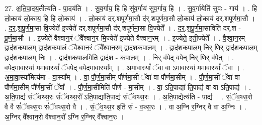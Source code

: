 \documentclass[17pt]{extarticle}
\begin{document}
27. अ॒ति॒पा॒दय॒तीत्य॑ति - पा॒दय॑ति । . सु॒व॒र्गाय॒ हि हि सु॑व॒र्गाय॑ सुव॒र्गाय॒ हि । . सु॒व॒र्गायेति॑ सुवः - गाय॑ । . हि लो॒काय॑ लो॒काय॒ हि हि लो॒काय॑ । . लो॒काय॑ दर्.शपूर्णमा॒सौ द॑र्.शपूर्णमा॒सौ लो॒काय॑ लो॒काय॑ दर्.शपूर्णमा॒सौ । . द॒र्॒.श॒पू॒र्ण॒मा॒सा वि॒ज्येते॑ इ॒ज्येते॑ दर्.शपूर्णमा॒सौ द॑र्.शपूर्णमा॒सा वि॒ज्येते᳚ । . द॒र्॒.श॒पू॒र्ण॒मा॒साविति॑ दर्.श - पू॒र्ण॒मा॒सौ । . इ॒ज्येते॑ वैश्वान॒रं ॅवै᳚श्वान॒र मि॒ज्येते॑ इ॒ज्येते॑ वैश्वान॒रम् । . इ॒ज्येते॒ इती॒ज्येते᳚ । . वै॒श्वा॒न॒रम् द्वाद॑शकपाल॒म् द्वाद॑शकपालं ॅवैश्वान॒रं ॅवै᳚श्वान॒रम् द्वाद॑शकपालम् । . द्वाद॑शकपाल॒म् निर् णिर् द्वाद॑शकपाल॒म् द्वाद॑शकपाल॒म् निः । . द्वाद॑शकपाल॒मिति॒ द्वाद॑श - क॒पा॒ल॒म् । . निर् व॑पेद् वपे॒न् निर् णिर् व॑पेत् । . व॒पे॒द॒मा॒वा॒स्या॑ ममावा॒स्यां᳚ ॅवपेद् वपेदमावा॒स्या᳚म् । . अ॒मा॒वा॒स्यां᳚ ॅवा वा ऽमावा॒स्या॑ ममावा॒स्यां᳚ ॅवा । . अ॒मा॒वा॒स्या॑मित्य॑मा - वा॒स्या᳚म् । . वा॒ पौ॒र्ण॒मा॒सीम् पौ᳚र्णमा॒सीं ॅवा॑ वा पौर्णमा॒सीम् । . पौ॒र्ण॒मा॒सीं ॅवा॑ वा पौर्णमा॒सीम् पौ᳚र्णमा॒सीं ॅवा᳚ । . पौ॒र्ण॒मा॒सीमिति॑ पौर्ण - मा॒सीम् । . वा॒ ऽति॒पाद्या॑ ति॒पाद्य॑ वा वा ऽति॒पाद्य॑ । . अ॒ति॒पाद्य॑ संॅवथ्स॒रः सं॑ॅवथ्स॒रो॑ ऽति॒पाद्या॑ति॒पाद्य॑ संॅवथ्स॒रः । . अ॒ति॒पाद्येत्य॑ति - पाद्य॑ । . सं॒ॅव॒थ्स॒रो वै वै सं॑ॅवथ्स॒रः सं॑ॅवथ्स॒रो वै । . सं॒ॅव॒थ्स॒र इति॑ सं - व॒थ्स॒रः । . वा अ॒ग्नि र॒ग्निर् वै वा अ॒ग्निः । . अ॒ग्निर् वै᳚श्वान॒रो वै᳚श्वान॒रो᳚ ऽग्नि र॒ग्निर् वै᳚श्वान॒रः । \newline
\end{document}
